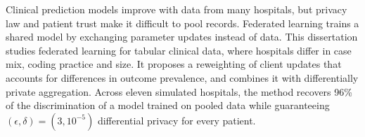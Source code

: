 Clinical prediction models improve with data from many hospitals, but privacy law and patient
trust make it difficult to pool records. Federated learning trains a shared model by exchanging
parameter updates instead of data. This dissertation studies federated learning for tabular
clinical data, where hospitals differ in case mix, coding practice and size. It proposes a
reweighting of client updates that accounts for differences in outcome prevalence, and combines
it with differentially private aggregation. Across eleven simulated hospitals, the method
recovers 96\% of the discrimination of a model trained on pooled data while guaranteeing
$(\epsilon, \delta) = (3, 10^{-5})$ differential privacy for every patient.
